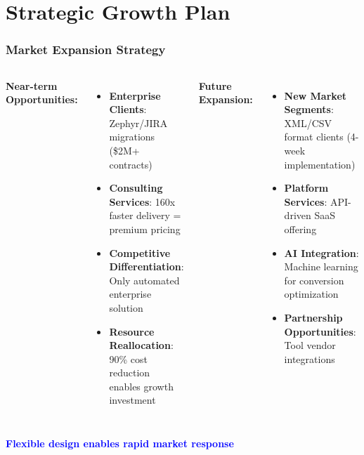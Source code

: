 \section{Strategic Growth Plan}
\begin{frame}
\frametitle{Market Expansion Strategy}
\begin{columns}
\textbf{Near-term Opportunities:}
\begin{itemize}
    \item \textbf{Enterprise Clients}: Zephyr/JIRA migrations (\$2M+ contracts)
    \item \textbf{Consulting Services}: 160x faster delivery = premium pricing
    \item \textbf{Competitive Differentiation}: Only automated enterprise solution
    \item \textbf{Resource Reallocation}: 90\% cost reduction enables growth investment
\end{itemize}

\textbf{Future Expansion:}
\begin{itemize}
    \item \textbf{New Market Segments}: XML/CSV format clients (4-week implementation)
    \item \textbf{Platform Services}: API-driven SaaS offering
    \item \textbf{AI Integration}: Machine learning for conversion optimization
    \item \textbf{Partnership Opportunities}: Tool vendor integrations
\end{itemize}
\end{columns}

\vspace{0.3cm}
\begin{center}
\textcolor{blue}{\textbf{Flexible design enables rapid market response}}
\end{center}
\end{frame}

